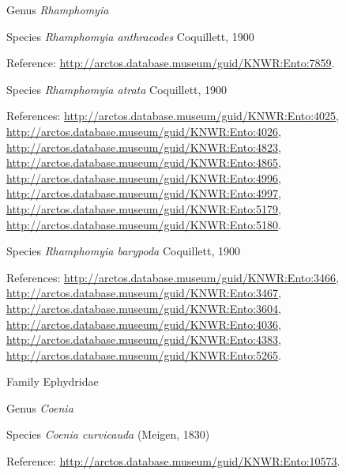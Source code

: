 \documentclass[9pt, article]{memoir}
\begin{document}
\begin{multicols}{2}
\vspace{6pt}\noindent\hspace{30pt}Genus \textit{Rhamphomyia}


\vspace{6pt}\noindent\hspace{36pt}Species \textit{Rhamphomyia anthracodes} Coquillett, 1900


\vspace{6pt}Reference: 
\url{http://arctos.database.museum/guid/KNWR:Ento:7859}.

\vspace{6pt}\noindent\hspace{36pt}Species \textit{Rhamphomyia atrata} Coquillett, 1900


\vspace{6pt}References: 
\url{http://arctos.database.museum/guid/KNWR:Ento:4025}, 
\url{http://arctos.database.museum/guid/KNWR:Ento:4026}, 
\url{http://arctos.database.museum/guid/KNWR:Ento:4823}, 
\url{http://arctos.database.museum/guid/KNWR:Ento:4865}, 
\url{http://arctos.database.museum/guid/KNWR:Ento:4996}, 
\url{http://arctos.database.museum/guid/KNWR:Ento:4997}, 
\url{http://arctos.database.museum/guid/KNWR:Ento:5179}, 
\url{http://arctos.database.museum/guid/KNWR:Ento:5180}.

\vspace{6pt}\noindent\hspace{36pt}Species \textit{Rhamphomyia barypoda} Coquillett, 1900


\vspace{6pt}References: 
\url{http://arctos.database.museum/guid/KNWR:Ento:3466}, 
\url{http://arctos.database.museum/guid/KNWR:Ento:3467}, 
\url{http://arctos.database.museum/guid/KNWR:Ento:3604}, 
\url{http://arctos.database.museum/guid/KNWR:Ento:4036}, 
\url{http://arctos.database.museum/guid/KNWR:Ento:4383}, 
\url{http://arctos.database.museum/guid/KNWR:Ento:5265}.

\vspace{6pt}\noindent\hspace{24pt}Family Ephydridae


\vspace{6pt}\noindent\hspace{30pt}Genus \textit{Coenia}


\vspace{6pt}\noindent\hspace{36pt}Species \textit{Coenia curvicauda} (Meigen, 1830)


\vspace{6pt}Reference: 
\url{http://arctos.database.museum/guid/KNWR:Ento:10573}.


\end{multicols}
\end{document}
